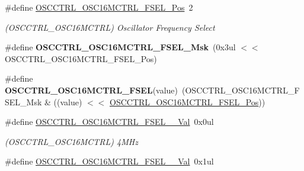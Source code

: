 \begin{DoxyCompactItemize}
\item 
\hypertarget{group___s_a_m_l21___o_s_c_c_t_r_l_gab65dca33592ddda96df4de27654a4869}{}\#define \hyperlink{group___s_a_m_l21___o_s_c_c_t_r_l_gab65dca33592ddda96df4de27654a4869}{O\+S\+C\+C\+T\+R\+L\+\_\+\+O\+S\+C16\+M\+C\+T\+R\+L\+\_\+\+F\+S\+E\+L\+\_\+\+Pos}~2\label{group___s_a_m_l21___o_s_c_c_t_r_l_gab65dca33592ddda96df4de27654a4869}

\begin{DoxyCompactList}\small\item\em (O\+S\+C\+C\+T\+R\+L\+\_\+\+O\+S\+C16\+M\+C\+T\+R\+L) Oscillator Frequency Select \end{DoxyCompactList}\item 
\hypertarget{group___s_a_m_l21___o_s_c_c_t_r_l_gacd4ed8367273fa5dd3717cbc99820889}{}\#define {\bfseries O\+S\+C\+C\+T\+R\+L\+\_\+\+O\+S\+C16\+M\+C\+T\+R\+L\+\_\+\+F\+S\+E\+L\+\_\+\+Msk}~(0x3ul $<$$<$ O\+S\+C\+C\+T\+R\+L\+\_\+\+O\+S\+C16\+M\+C\+T\+R\+L\+\_\+\+F\+S\+E\+L\+\_\+\+Pos)\label{group___s_a_m_l21___o_s_c_c_t_r_l_gacd4ed8367273fa5dd3717cbc99820889}

\item 
\hypertarget{group___s_a_m_l21___o_s_c_c_t_r_l_ga1533a5fb3034348554b19a3343c6714b}{}\#define {\bfseries O\+S\+C\+C\+T\+R\+L\+\_\+\+O\+S\+C16\+M\+C\+T\+R\+L\+\_\+\+F\+S\+E\+L}(value)~(O\+S\+C\+C\+T\+R\+L\+\_\+\+O\+S\+C16\+M\+C\+T\+R\+L\+\_\+\+F\+S\+E\+L\+\_\+\+Msk \& ((value) $<$$<$ \hyperlink{group___s_a_m_l21___o_s_c_c_t_r_l_gab65dca33592ddda96df4de27654a4869}{O\+S\+C\+C\+T\+R\+L\+\_\+\+O\+S\+C16\+M\+C\+T\+R\+L\+\_\+\+F\+S\+E\+L\+\_\+\+Pos}))\label{group___s_a_m_l21___o_s_c_c_t_r_l_ga1533a5fb3034348554b19a3343c6714b}

\item 
\hypertarget{group___s_a_m_l21___o_s_c_c_t_r_l_ga324709e0ecbff75960be0ff803f9b409}{}\#define \hyperlink{group___s_a_m_l21___o_s_c_c_t_r_l_ga324709e0ecbff75960be0ff803f9b409}{O\+S\+C\+C\+T\+R\+L\+\_\+\+O\+S\+C16\+M\+C\+T\+R\+L\+\_\+\+F\+S\+E\+L\+\_\+\_\+\+Val}~0x0ul\label{group___s_a_m_l21___o_s_c_c_t_r_l_ga324709e0ecbff75960be0ff803f9b409}

\begin{DoxyCompactList}\small\item\em (O\+S\+C\+C\+T\+R\+L\+\_\+\+O\+S\+C16\+M\+C\+T\+R\+L) 4\+M\+Hz \end{DoxyCompactList}\item 
\hypertarget{group___s_a_m_l21___o_s_c_c_t_r_l_gaad8e721a7ea4d11d0d2d0afe288d190e}{}\#define \hyperlink{group___s_a_m_l21___o_s_c_c_t_r_l_gaad8e721a7ea4d11d0d2d0afe288d190e}{O\+S\+C\+C\+T\+R\+L\+\_\+\+O\+S\+C16\+M\+C\+T\+R\+L\+\_\+\+F\+S\+E\+L\+\_\+\_\+\+Val}~0x1ul\label{group___s_a_m_l21___o_s_c_c_t_r_l_gaad8e721a7ea4d11d0d2d0afe288d190e}


\end{DoxyCompactItemize}
